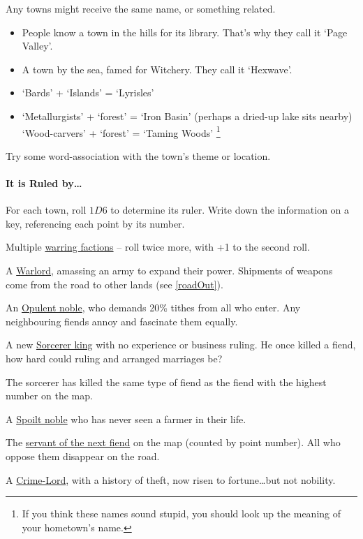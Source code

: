 \begin{multicols}{2}
Any towns might receive the same name, or something related.

\begin{itemize}
  \item
  People know a town in the hills for its library. That's why they call
  it `Page Valley'.
  \item
  A town by the sea, famed for Witchery.
  They call it `Hexwave'.
  \item
  `Bards' + `Islands' = `Lyrisles'
  \item
  \ifodd\value{r4}
    `Metallurgists' + `forest' = `Iron Basin' (perhaps a dried-up lake sits nearby)
  \else
    `Wood-carvers' + `forest' = `Taming Woods'%
  \fi
  \footnote{If you think these names sound stupid, you should look up the meaning of your hometown's name.}
\end{itemize}

Try some word-association with the town's theme or location.

\paragraph{It is Ruled by\ldots{}}

For each town, roll $1D6$ to determine its ruler.
Write down the information on a key, referencing each point by its number.

\begin{dlist}
  \item
  Multiple \underline{warring factions} -- roll twice more, with +1 to the second roll.
  \item
  A \underline{Warlord}, amassing an army to expand their power.
  Shipments of weapons come from the road to other lands
  (see \vref{roadOut}).
  \item
  An \underline{Opulent noble}, who demands 20\% tithes from all who enter.
  Any neighbouring fiends annoy and fascinate them equally.
  \item
  A new \underline{Sorcerer king} with no experience or business ruling.
  He once killed a fiend, how hard could ruling  and arranged marriages be?

  The sorcerer has killed the same type of fiend as the fiend with the highest number on the map.
  \item
  A \underline{Spoilt noble} who has never seen a farmer in their life.
  \item
  The \underline{servant of the next fiend} on the map (counted by point number).
  All who oppose them disappear on the road.
  \item
  A \underline{Crime-Lord}, with a history of theft, now risen to fortune\ldots but not nobility.


\end{dlist}
\end{multicols}
